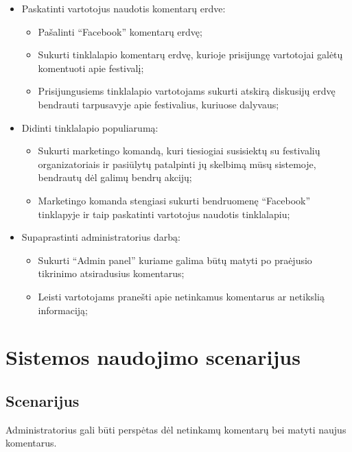 \documentclass{VUMIFPSkursinis}
\begin{document}
\begin{itemize}
\begin{itemize}
    \end{itemize}
\item Paskatinti vartotojus naudotis komentarų erdve:
    \begin{itemize}
    \item Pašalinti “Facebook” komentarų erdvę;
    \item Sukurti tinklalapio komentarų erdvę, kurioje prisijungę vartotojai galėtų komentuoti apie festivalį;
    \item Prisijungusiems tinklalapio vartotojams sukurti atskirą diskusijų erdvę bendrauti tarpusavyje apie festivalius, kuriuose dalyvaus;
    \end{itemize}
\item Didinti tinklalapio populiarumą:
    \begin{itemize}
    \item Sukurti marketingo komandą, kuri tiesiogiai susisiektų su festivalių organizatoriais ir pasiūlytų patalpinti jų skelbimą mūsų sistemoje, bendrautų dėl galimų bendrų akcijų;
    \item Marketingo komanda stengiasi sukurti bendruomenę “Facebook” tinklapyje ir taip paskatinti vartotojus naudotis tinklalapiu;
    \end{itemize}
\item Supaprastinti administratorius darbą:
    \begin{itemize}
    \item Sukurti “Admin panel” kuriame galima būtų matyti po praėjusio tikrinimo atsiradusius komentarus;
    \item Leisti vartotojams pranešti apie netinkamus komentarus ar netikslią informaciją;
    \end{itemize}
\end{itemize}

\section{Sistemos naudojimo scenarijus}
\subsection{Scenarijus}

Administratorius gali būti perspėtas dėl netinkamų komentarų bei matyti naujus komentarus.
\end{document}
